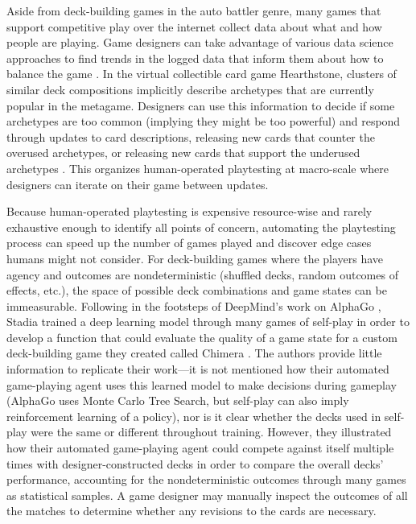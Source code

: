 \documentclass[letterpaper]{article} %
\begin{document}
Aside from deck-building games in the auto battler genre, many games that support competitive
play over the internet collect data about what and how people are playing.  Game
designers can take advantage of various data science approaches to find trends in
the logged data that inform them about how to balance the game \cite{nce-gameAIpro2}.
In the virtual collectible card game Hearthstone, clusters of similar deck
compositions implicitly describe archetypes that are currently popular in the
metagame.  Designers can use this information to decide if some archetypes are too
common (implying they might be too powerful) and respond through updates to card
descriptions, releasing new cards that counter the overused archetypes, or
releasing new cards that support the underused archetypes \cite{blizzard-gamebalancetalk-keg2019}.
This %
organizes human-operated playtesting at macro-scale where designers
can iterate on their game between updates. %

Because human-operated playtesting is expensive resource-wise and rarely
exhaustive enough to identify all points of concern, automating the playtesting
process can speed up the number of games played and discover edge cases humans
might not consider.  For deck-building games where the players have
agency and outcomes are nondeterministic (shuffled decks, random outcomes of effects,
etc.), the space of possible deck combinations and game states can be immeasurable.
Following in the footsteps of DeepMind's work on AlphaGo \cite{alphago}, Stadia
trained a deep learning model through many games of self-play in order to develop
a function that could evaluate the quality of a game state for a custom deck-building
game they created called Chimera \cite{chimera-mlagent}.  The authors provide
little information to replicate their work---it is not mentioned how their automated
game-playing agent uses this learned model to make decisions during gameplay
(AlphaGo uses Monte Carlo Tree Search, but self-play can also imply reinforcement
learning of a policy), nor is it clear whether the decks used in self-play were
the same or different throughout training.  However, they illustrated how their
automated game-playing agent could compete against itself multiple times with
designer-constructed decks in order to compare the overall decks' performance,
accounting for the nondeterministic outcomes through many games as statistical
samples.  A game designer may manually inspect the outcomes of all the matches
to determine whether any revisions to the cards are necessary.
\end{document}
